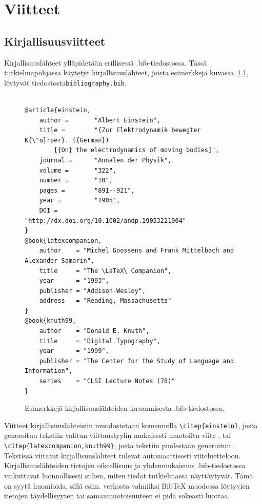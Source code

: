 \chapter{Viitteet}

\section{Kirjallisuusviitteet}

Kirjallisuuslähteet ylläpidetään erillisessä .bib-tiedostossa. Tässä tutkielmapohjassa käytetyt kirjallisuuslähteet, joista esimerkkejä kuvassa~\ref{bibexamples}, löytyvät tiedostosta\newline \texttt{bibliography.bib}.

\begin{figure}[h!]
    \centering
    \begin{scriptsize}
				
\begin{verbatim}

@article{einstein,
    author =       "Albert Einstein",
    title =        "{Zur Elektrodynamik bewegter K{\"o}rper}. ({German})
        [{On} the electrodynamics of moving bodies]",
    journal =      "Annalen der Physik",
    volume =       "322",
    number =       "10",
    pages =        "891--921",
    year =         "1905",
    DOI =          "http://dx.doi.org/10.1002/andp.19053221004"
}
@book{latexcompanion,
    author    = "Michel Goossens and Frank Mittelbach and Alexander Samarin",
    title     = "The \LaTeX\ Companion",
    year      = "1993",
    publisher = "Addison-Wesley",
    address   = "Reading, Massachusetts"
}
@book{knuth99,
    author    = "Donald E. Knuth",
    title     = "Digital Typography",
    year      = "1999",
    publisher = "The Center for the Study of Language and Information",
    series    = "CLSI Lecture Notes (78)"
}
\end{verbatim}
\end{scriptsize}
    \caption{Esimerkkejä kirjallisuuslähteiden kuvaamisesta .bib-tiedostossa.}
    \label{bibexamples}
\end{figure}

Viitteet kirjallisuuslähteisiin muodostetaan komennolla \texttt{\textbackslash citep\{einstein\}}, josta generoituu tekstiin valitun viittaustyylin mukaisesti muotoiltu viite \citep{einstein}, tai \texttt{\textbackslash citep\{latexcompanion,knuth99\}}, josta tekstiin puolestaan generoituu \citep{latexcompanion,knuth99}. Tekstissä viitatut kirjallisuuslähteet tulevat automaattisesti viiteluetteloon. Kirjallisuuslähteiden tietojen oikeellisuus ja yhdenmukaisuus .bib-tiedostossa vaikuttavat luonnollisesti siihen, miten tiedot tutkielmassa näyttäytyvät. Tämä on syytä huomioida, sillä esim. verkosta valmiiksi {Bib\TeX} muodossa löytyvien tietojen täydellisyyten tai samanmuotoisuuteen ei pidä sokeasti luottaa.  

